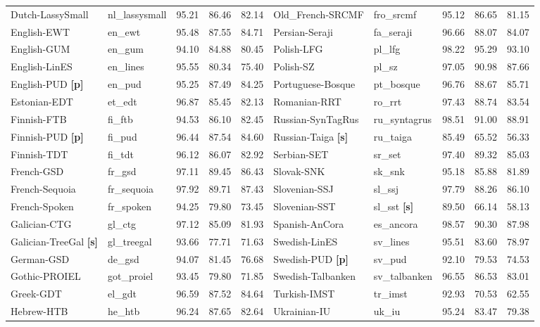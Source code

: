 \documentclass[11pt,letterpaper]{article}
\begin{document}
\begin{table*}[!ht]
{\begin{tabular}{l|l|ccc||l|l|ccc}
Dutch-LassySmall & nl\_lassysmall & 95.21 & 86.46 & 82.14 & Old\_French-SRCMF & fro\_srcmf & 95.12 & 86.65 & 81.15 \\
English-EWT & en\_ewt & 95.48 & 87.55 & 84.71 & Persian-Seraji & fa\_seraji & 96.66 & 88.07 & 84.07 \\
English-GUM & en\_gum & 94.10 & 84.88 & 80.45 & Polish-LFG & pl\_lfg & 98.22 & 95.29 & 93.10 \\
English-LinES & en\_lines & 95.55 & 80.34 & 75.40 & Polish-SZ & pl\_sz & 97.05 & 90.98 & 87.66 \\
English-PUD \textbf{[p]} & en\_pud & 95.25 & 87.49 & 84.25 & Portuguese-Bosque & pt\_bosque & 96.76 & 88.67 & 85.71 \\
Estonian-EDT & et\_edt & 96.87 & 85.45 & 82.13 & Romanian-RRT & ro\_rrt & 97.43 & 88.74 & 83.54 \\
Finnish-FTB & fi\_ftb & 94.53 & 86.10 & 82.45 & Russian-SynTagRus & ru\_syntagrus & 98.51 & 91.00 & 88.91 \\
Finnish-PUD \textbf{[p]} & fi\_pud & 96.44 & 87.54 & 84.60 & Russian-Taiga \textbf{[s]} & ru\_taiga & 85.49 & 65.52 & 56.33 \\
Finnish-TDT & fi\_tdt & 96.12 & 86.07 & 82.92 & Serbian-SET & sr\_set & 97.40 & 89.32 & 85.03 \\
French-GSD & fr\_gsd & 97.11 & 89.45 & 86.43 & Slovak-SNK & sk\_snk & 95.18 & 85.88 & 81.89 \\
French-Sequoia & fr\_sequoia & 97.92 & 89.71 & 87.43 & Slovenian-SSJ & sl\_ssj & 97.79 & 88.26 & 86.10 \\
French-Spoken & fr\_spoken & 94.25 & 79.80 & 73.45 & Slovenian-SST & sl\_sst \textbf{[s]} & 89.50 & 66.14 & 58.13 \\
Galician-CTG & gl\_ctg & 97.12 & 85.09 & 81.93 & Spanish-AnCora & es\_ancora & 98.57 & 90.30 & 87.98 \\
Galician-TreeGal \textbf{[s]} & gl\_treegal & 93.66 & 77.71 & 71.63 & Swedish-LinES & sv\_lines & 95.51 & 83.60 & 78.97 \\
German-GSD & de\_gsd & 94.07 & 81.45 & 76.68 & Swedish-PUD \textbf{[p]} & sv\_pud & 92.10 & 79.53 & 74.53 \\
Gothic-PROIEL & got\_proiel & 93.45 & 79.80 & 71.85 & Swedish-Talbanken & sv\_talbanken & 96.55 & 86.53 & 83.01 \\
Greek-GDT & el\_gdt & 96.59 & 87.52 & 84.64 & Turkish-IMST & tr\_imst & 92.93 & 70.53 & 62.55 \\
Hebrew-HTB & he\_htb & 96.24 & 87.65 & 82.64 & Ukrainian-IU & uk\_iu & 95.24 & 83.47 & 79.38 \\

\end{tabular}}
\end{table*}
\end{document}
